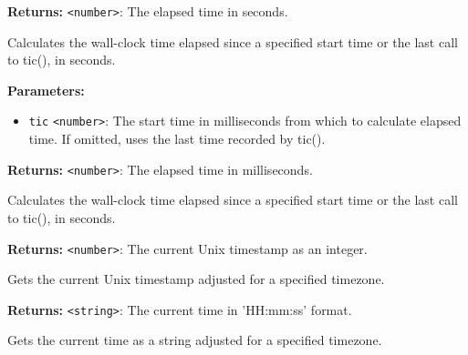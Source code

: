 \documentclass[12pt,a4paper]{article}
\begin{document}
\noindent \textbf{Returns:} \texttt{<number>}: The elapsed time in seconds.

\noindent Calculates the wall-clock time elapsed since a specified start time or the last call to \textasciigrave{}tic()\textasciigrave{}, in seconds.

\vspace{5mm}
\noindent {}


\noindent \textbf{Parameters:}
\begin{itemize}
  \item \texttt{tic} \texttt{<number>}: The start time in milliseconds from which to calculate elapsed time. If omitted, uses the last time recorded by \textasciigrave{}tic()\textasciigrave{}.
\end{itemize}

\noindent \textbf{Returns:} \texttt{<number>}: The elapsed time in milliseconds.

\noindent Calculates the wall-clock time elapsed since a specified start time or the last call to \textasciigrave{}tic()\textasciigrave{}, in seconds.

\vspace{5mm}
\noindent {}


\noindent \textbf{Returns:} \texttt{<number>}: The current Unix timestamp as an integer.

\noindent Gets the current Unix timestamp adjusted for a specified timezone.

\vspace{5mm}
\noindent {}


\noindent \textbf{Returns:} \texttt{<string>}: The current time in 'HH:mm:ss' format.

\noindent Gets the current time as a string adjusted for a specified timezone.

\vspace{5mm}
\noindent {}
\end{document}
